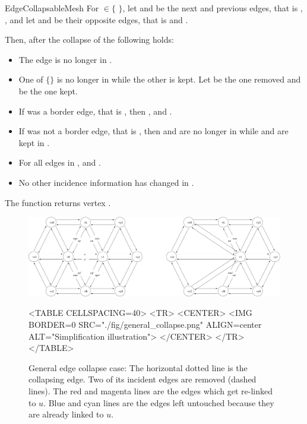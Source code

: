 \begin{ccRefConcept}{EdgeCollapsableMesh}
For  $\in \{$  $\}$, let  and  be the next and previous 
edges, that is , , and let 
 and  be their opposite edges, that is 
 and .

Then, after the collapse of  the following holds:

\begin{itemize}
\item The edge  is no longer in .
\item One of $\{$$\}$ is no longer in  while the other is kept. Let  be the one removed and  be the one kept.
\item If  was a border edge, that is , then , and .
\item If  was not a border edge, that is , then  and  are no longer in  while  and  are kept in .
\item For all edges  in ,  and .
\item No other incidence information has changed in .
\end{itemize}

The function returns vertex . 

\begin{figure}[htbp]
\begin{ccTexOnly}
\begin{center}
\includegraphics[width=17cm]{Surface_mesh_simplification_ref/fig/general_collapse} %
\end{center}
\end{ccTexOnly}
\begin{ccHtmlOnly}
<TABLE CELLSPACING=40>
<TR>
<CENTER>
<IMG BORDER=0 SRC="./fig/general_collapse.png" ALIGN=center ALT="Simplification illustration">
</CENTER>
</TR>
</TABLE>
\end{ccHtmlOnly}
\caption{General edge collapse case: The horizontal dotted line is the collapsing edge. Two of its incident edges are removed (dashed lines). The red and magenta lines are the edges which get re-linked to $u$. Blue and cyan lines are the edges left untouched because they are already linked to $u$.}
\end{figure}



\end{ccRefConcept}
